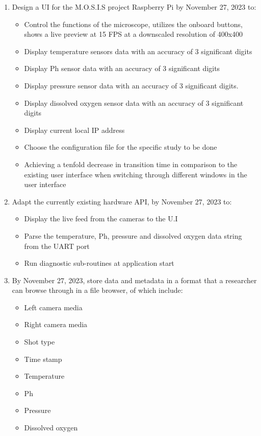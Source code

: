 \begin{enumerate}
	\item Design a UI for the M.O.S.I.S project Raspberry Pi by November 27, 2023 to:
	      \begin{itemize}
		      \item Control the functions of the microscope, utilizes the onboard buttons, shows a live preview at 15 FPS at a downscaled resolution of 400x400
		      \item Display temperature sensors data with an accuracy of 3 significant digits
		      \item Display Ph sensor data with an accuracy of 3 significant digits
		      \item Display pressure sensor data with an accuracy of 3 significant digits.
		      \item Display dissolved oxygen sensor data with an accuracy of 3 significant digits
		      \item Display current local IP address
		      \item Choose the configuration file for the specific study to be done
		      \item Achieving a tenfold decrease in transition time in comparison to the existing user interface when switching through different windows in the user interface
	      \end{itemize}
	\item Adapt the currently existing hardware API, by November 27, 2023 to:
	      \begin{itemize}
		      \item Display the live feed from the cameras to the U.I
		      \item Parse the temperature, Ph, pressure and dissolved oxygen data string from the UART port
		      \item Run diagnostic sub-routines at application start
	      \end{itemize}
	\item By November 27, 2023, store data and metadata in a format that a researcher can browse through in a file browser, of which include:
	      \begin{itemize}
		      \item Left camera media
		      \item Right camera media
		      \item Shot type
		      \item Time stamp
		      \item Temperature
		      \item Ph
		      \item Pressure
		      \item Dissolved oxygen
	      \end{itemize}
\end{enumerate}
